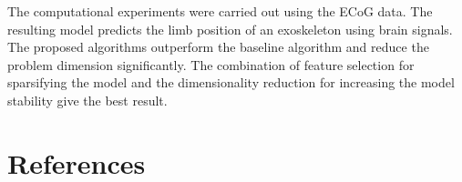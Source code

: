 \documentclass[preprint,12pt]{elsarticle}
\theoremstyle{definition}
\begin{document}
The computational experiments were carried out using the ECoG data. 
The resulting model predicts the limb position of an exoskeleton using brain signals.
The proposed algorithms outperform the baseline algorithm and reduce the problem dimension significantly.
The combination of feature selection for sparsifying the model and the dimensionality reduction for increasing the model stability give the best result.



\section*{References}


\end{document}
